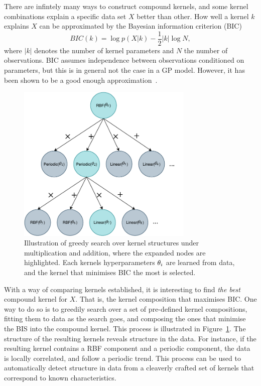 There are infintely many ways to construct compound kernels, and some
kernel combinations explain a specific data set $X$ better than
other. How well a kernel $k$ explains $X$ can be approximated
by the Bayesian information criterion (BIC)
\begin{equation}
  BIC(k) = \log p(X \vert k) - \frac{1}{2} \vert k \vert \log N,
\end{equation}
where $\vert k \vert$ denotes the number of kernel parameters and $N$
the number of observations. BIC assumes independence between
observations conditioned on parameters, but this is in general not the
case in a GP model. However, it has been shown to be a good enough approximation~\cite{duvenaud2013structure}.
\begin{figure}
  \centering
  \includegraphics[width=0.75\textwidth]{figures/compound-kernel-search}
  \caption{Illustration of greedy search over kernel structures under
    multiplication and addition, where the
    expanded nodes are highlighted. Each kernels hyperparameters
    $\theta_i$ are learned from data, and the kernel that
    minimises BIC the most is selected.}\label{fig:compound-kernel-search}
\end{figure}

With a way of comparing kernels established, it is interesting to find
\textit{the best} compound kernel for $X$. That is, the kernel
composition that maximises BIC. One way to do so is to
greedily search over a set of pre-defined kernel compositions, fitting
them to data as the search goes, and composing the ones that minimise
the BIS into the compound kernel. This process is illustrated in Figure~\ref{fig:compound-kernel-search}.
The structure of the resulting kernels reveals structure in the
data. For instance, if the resulting kernel contains a RBF component and a periodic
component, the data is locally correlated, and follow a periodic
trend. This process can be used to automatically detect structure in
data from a cleaverly crafted set of kernels that correspond to
known characteristics.

